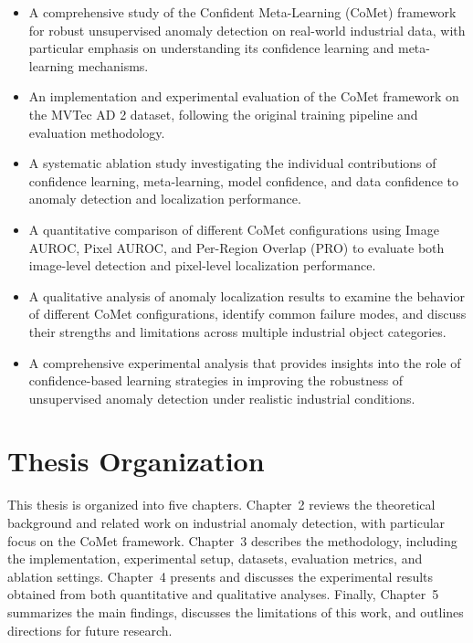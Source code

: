 \documentclass[12pt,openany,oneside]{book}
\begin{document}
\begin{itemize}
    \item A comprehensive study of the Confident Meta-Learning (CoMet) framework for robust unsupervised anomaly detection on real-world industrial data, with particular emphasis on understanding its confidence learning and meta-learning mechanisms.

    \item An implementation and experimental evaluation of the CoMet framework on the MVTec AD 2 dataset, following the original training pipeline and evaluation methodology.

    \item A systematic ablation study investigating the individual contributions of confidence learning, meta-learning, model confidence, and data confidence to anomaly detection and localization performance.

    \item A quantitative comparison of different CoMet configurations using Image AUROC, Pixel AUROC, and Per-Region Overlap (PRO) to evaluate both image-level detection and pixel-level localization performance.

    \item A qualitative analysis of anomaly localization results to examine the behavior of different CoMet configurations, identify common failure modes, and discuss their strengths and limitations across multiple industrial object categories.

    \item A comprehensive experimental analysis that provides insights into the role of confidence-based learning strategies in improving the robustness of unsupervised anomaly detection under realistic industrial conditions.

\end{itemize}

\section{Thesis Organization}

This thesis is organized into five chapters. Chapter~2 reviews the theoretical background and related work on industrial anomaly detection, with particular focus on the CoMet framework. Chapter~3 describes the methodology, including the implementation, experimental setup, datasets, evaluation metrics, and ablation settings. Chapter~4 presents and discusses the experimental results obtained from both quantitative and qualitative analyses. Finally, Chapter~5 summarizes the main findings, discusses the limitations of this work, and outlines directions for future research.
\end{document}
